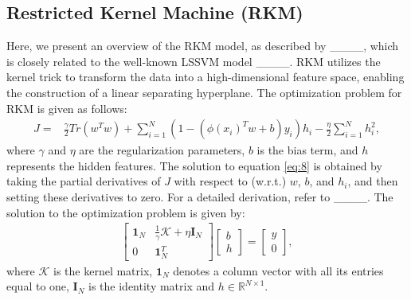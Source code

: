 \subsection{Restricted Kernel Machine (RKM)}
Here, we present an overview of the RKM model, as described by ____, which is closely related to the well-known LSSVM model ____. RKM utilizes the kernel trick to transform the data into a high-dimensional feature space, enabling the construction of a linear separating hyperplane. The optimization problem for RKM is given as follows:
\begin{align}
\label{eq:8}
      J = & \frac{\gamma}{2} Tr(w^Tw) + \sum_{i=1}^N (1-(\phi(x_i)^Tw+b)y_i)h_i - \frac{\eta}{2} \sum_{i=1}^Nh_i^2,
\end{align}
where \(\gamma\) and \(\eta\) are the regularization parameters, \(b\) is the bias term, and \(h\) represents the hidden features. The solution to equation \eqref{eq:8} is obtained by taking the partial derivatives of \(J\) with respect to (w.r.t.) \(w\), \(b\), and \(h_i\), and then setting these derivatives to zero. For a detailed derivation, refer to ____. The solution to the optimization problem is given by:
\begin{align}
    \begin{bmatrix}
\mathbf{1}_N & \frac{1}{\gamma} \mathcal{K} + \eta \mathbf{I}_N \\
0  & \mathbf{1}_N^T
\end{bmatrix}
\begin{bmatrix}
b \\
h
\end{bmatrix}
= 
\begin{bmatrix}
y \\
0
\end{bmatrix},
\end{align}
where $\mathcal{K}$ is the kernel matrix, \(\mathbf{1}_N\) denotes a column vector with all its entries equal to one, $\mathbf{I}_N$ is the identity matrix and $h \in \mathbb{R}^{N \times 1}$.